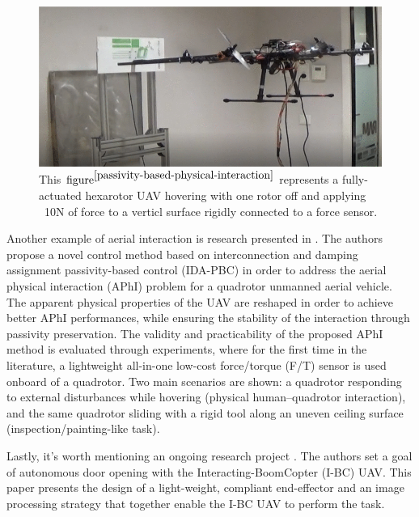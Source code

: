 \begin{figure}[H]
	\includegraphics[width=0.95\columnwidth]{figure/passivity-based-interaction.png}	
	\centering
	\caption{This $\text{figure}^{\cite{passivity-based-physical-interaction}}$ represents a fully-actuated hexarotor UAV hovering with one rotor off and applying ~10N of force to a verticl surface rigidly connected to a force sensor.}
	\label{fig:aerial_compliance}
\end{figure}

Another example of aerial interaction is research presented in \cite{passivity-based-aerial-interaction}. The authors propose a novel control method based on interconnection and damping assignment passivity-based control (IDA-PBC) in order to address the aerial physical interaction (APhI) problem for a quadrotor unmanned aerial vehicle. The apparent physical properties of the UAV are reshaped in order to achieve better APhI performances, while ensuring the stability of the interaction through passivity preservation. The validity and practicability of the proposed APhI method is evaluated through experiments, where for the first time in the literature, a lightweight all-in-one low-cost force/torque (F/T) sensor is used onboard of a quadrotor. Two main scenarios are shown: a quadrotor responding to external disturbances while hovering (physical human–quadrotor interaction), and the same quadrotor sliding with a rigid tool along an uneven ceiling surface (inspection/painting-like task).

Lastly, it's worth mentioning an ongoing research project \cite{door-opening}. The authors set a goal of autonomous door opening with the Interacting-BoomCopter (I-BC) UAV. This paper presents the design of a light-weight, compliant end-effector and an image processing strategy that together enable the I-BC UAV to perform the task. 

